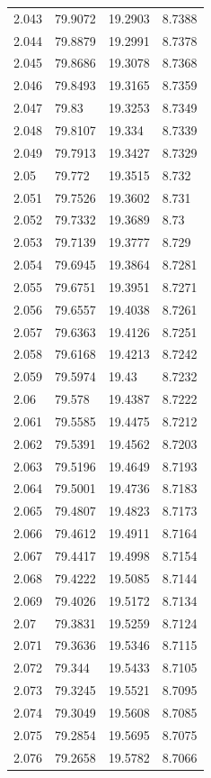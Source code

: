 \begin{tabular}{llll}
2.043 & 79.9072 & 19.2903 & 8.7388 \\
2.044 & 79.8879 & 19.2991 & 8.7378 \\
2.045 & 79.8686 & 19.3078 & 8.7368 \\
2.046 & 79.8493 & 19.3165 & 8.7359 \\
2.047 & 79.83 & 19.3253 & 8.7349 \\
2.048 & 79.8107 & 19.334 & 8.7339 \\
2.049 & 79.7913 & 19.3427 & 8.7329 \\
2.05 & 79.772 & 19.3515 & 8.732 \\
2.051 & 79.7526 & 19.3602 & 8.731 \\
2.052 & 79.7332 & 19.3689 & 8.73 \\
2.053 & 79.7139 & 19.3777 & 8.729 \\
2.054 & 79.6945 & 19.3864 & 8.7281 \\
2.055 & 79.6751 & 19.3951 & 8.7271 \\
2.056 & 79.6557 & 19.4038 & 8.7261 \\
2.057 & 79.6363 & 19.4126 & 8.7251 \\
2.058 & 79.6168 & 19.4213 & 8.7242 \\
2.059 & 79.5974 & 19.43 & 8.7232 \\
2.06 & 79.578 & 19.4387 & 8.7222 \\
2.061 & 79.5585 & 19.4475 & 8.7212 \\
2.062 & 79.5391 & 19.4562 & 8.7203 \\
2.063 & 79.5196 & 19.4649 & 8.7193 \\
2.064 & 79.5001 & 19.4736 & 8.7183 \\
2.065 & 79.4807 & 19.4823 & 8.7173 \\
2.066 & 79.4612 & 19.4911 & 8.7164 \\
2.067 & 79.4417 & 19.4998 & 8.7154 \\
2.068 & 79.4222 & 19.5085 & 8.7144 \\
2.069 & 79.4026 & 19.5172 & 8.7134 \\
2.07 & 79.3831 & 19.5259 & 8.7124 \\
2.071 & 79.3636 & 19.5346 & 8.7115 \\
2.072 & 79.344 & 19.5433 & 8.7105 \\
2.073 & 79.3245 & 19.5521 & 8.7095 \\
2.074 & 79.3049 & 19.5608 & 8.7085 \\
2.075 & 79.2854 & 19.5695 & 8.7075 \\
2.076 & 79.2658 & 19.5782 & 8.7066 \\

\end{tabular}
